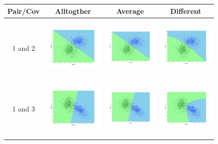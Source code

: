 \documentclass[a4paper]{article}
\begin{document}
			\begin{figure}
			\begin{tabular}{|c|c|c|c|}
				\hline
				Pair/Cov &  Alltogther & Average & Different	\\
				\hline
				1 and
				2&\includegraphics[width=40mm,height=30mm]{bayes/over/pair/12/all_cov.png}&\includegraphics[width=40mm,height=30mm]{bayes/over/pair/12/avg_cov.png}
				&\includegraphics[width=40mm,height=30mm]{bayes/over/pair/12/diff_cov.png}\\
				\hline
				1 and
				3&\includegraphics[width=40mm,height=30mm]{bayes/over/pair/13/all_cov.png}&\includegraphics[width=40mm,height=30mm]{bayes/over/pair/13/avg_cov.png}
				&\includegraphics[width=40mm,height=30mm]{bayes/over/pair/13/diff_cov.png}\\

\end{tabular}
\end{figure}
\end{document}
